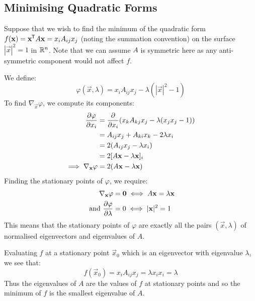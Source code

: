 \documentclass[../main.tex]{subfiles}
\begin{document}
\subsection{Minimising Quadratic Forms}
Suppose that we wish to find the minimum of the quadratic form $f(\mathbf{\bm{x}}) = \mathbf{\bm{x}}^{{\mkern-1.5mu\mathsf{T}}} A \mathbf{\bm{x}} = x_i A_{i j} x_j$ (noting the summation convention) on the surface $|\vec{x}|^2 = 1$ in $\mathbb{R}^{n}$.
Note that we can assume $A$ is symmetric here as any anti-symmetric component would not affect $f$.

We define:
\[
  \varphi(\vec{x}, \lambda) = x_i A_{i j} x_j - \lambda (|\vec{x}|^2 - 1)
\]
To find $\nabla_{\vec{x}} \varphi$, we compute its components:
\begin{align*}
  \pderiv{\varphi}{x_i} &= \pderiv{}{x_i}(x_k A_{k j} x_j - \lambda (x_j x_j - 1)) \\
                        &= A_{i j} x_j + A_{k i} x_k - 2\lambda x_i \\
                        &= 2(A_{i j} x_j - \lambda x_i) \\
                        &= 2[A \vec{x} - \lambda \vec{x}]_i \\
  \implies \nabla_{\vec{x}} \varphi &= 2(A\vec{x} - \lambda \vec{x})
\end{align*}
Finding the stationary points of $\varphi$, we require:
\begin{align*}
  \nabla_{\vec{x}} \varphi &= \vec{0} \iff A\vec{x} = \lambda \vec{x} \\
  \text{ and } \pderiv{\varphi}{\lambda} &= 0 \iff |\vec{x}|^2 = 1
\end{align*}
This means that the stationary points of $\varphi$ are exactly all the pairs $(\vec{x}, \lambda)$ of normalised eigenvectors and eigenvalues of $A$.

Evaluating $f$ at a stationary point $\vec{x}_0$ which is an eigenvector with eigenvalue $\lambda$, we see that:
\[
  f(\vec{x}_0) = x_i A_{i j} x_j = \lambda x_i x_i = \lambda
\]
Thus the eigenvalues of $A$ are the values of $f$ at stationary points and so the minimum of $f$ is the smallest eigenvalue of $A$.
\end{document}
